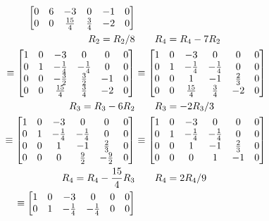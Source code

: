 \documentclass{../mathhomework}
\newenvironment{Mat}{\begin{bmatrix}}{\end{bmatrix}}
\begin{document}
\begin{problem}[1.6\#7]
\begin{align*}
\begin{Mat}
            0 & 6 & -3 & 0 & -1 & 0 \\
            0 & 0 & \frac{15}{4} & \frac{3}{4} & -2 & 0
        \end{Mat} \\
        R_2 = R_2/8 & \qquad{} R_4 = R_4 - 7R_2 \\
        \equiv \begin{Mat}
            1 & 0 & -3 & 0 & 0 & 0 \\
            0 & 1 & -\frac{1}{4} & -\frac{1}{4} & 0 & 0 \\
            0 & 0 & -\frac{3}{2} & \frac{3}{2} & -1 & 0 \\
            0 & 0 & \frac{15}{4} & \frac{3}{4} & -2 & 0
        \end{Mat}
        & \equiv \begin{Mat}
            1 & 0 & -3 & 0 & 0 & 0 \\
            0 & 1 & -\frac{1}{4} & -\frac{1}{4} & 0 & 0 \\
            0 & 0 & 1 & -1 & \frac{2}{3} & 0 \\
            0 & 0 & \frac{15}{4} & \frac{3}{4} & -2 & 0
        \end{Mat}  \\
        R_3 = R_3 - 6R_2 & \qquad{} R_3 = -2R_3/3 \\
        \equiv \begin{Mat}
            1 & 0 & -3 & 0 & 0 & 0 \\
            0 & 1 & -\frac{1}{4} & -\frac{1}{4} & 0 & 0 \\
            0 & 0 & 1 & -1 & \frac{2}{3} & 0 \\
            0 & 0 & 0 & \frac{9}{2} & -\frac{9}{2} & 0
        \end{Mat}
        & \equiv \begin{Mat}
            1 & 0 & -3 & 0 & 0 & 0 \\
            0 & 1 & -\frac{1}{4} & -\frac{1}{4} & 0 & 0 \\
            0 & 0 & 1 & -1 & \frac{2}{3} & 0 \\
            0 & 0 & 0 & 1 & -1 & 0
        \end{Mat} \\
        R_4 = R_4 -\frac{15}{4}R_3 & \qquad{} R_4 = 2R_4/9 \\
        \equiv \begin{Mat}
            1 & 0 & -3 & 0 & 0 & 0 \\
            0 & 1 & -\frac{1}{4} & -\frac{1}{4} & 0 & 0 \\

\end{Mat}
\end{align*}
\end{problem}
\end{document}
